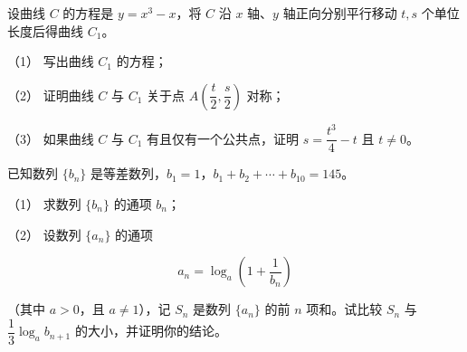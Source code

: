 \begin{question}
设曲线 $C$ 的方程是 $y=x^3-x$，将 $C$ 沿 $x$ 轴、$y$ 轴正向分别平行移动 $t,s$ 个单位长度后得曲线 $C_1$。

（1） 写出曲线 $C_1$ 的方程；

（2） 证明曲线 $C$ 与 $C_1$ 关于点 $A\left(\dfrac t2,\dfrac s2\right)$ 对称；

（3） 如果曲线 $C$ 与 $C_1$ 有且仅有一个公共点，证明 $s=\dfrac{t^3}{4}-t$ 且 $t\neq0$。

\end{question}
\begin{question}
已知数列 $\{b_n\}$ 是等差数列，$b_1=1$，$b_1+b_2+\cdots+b_{10}=145$。

（1） 求数列 $\{b_n\}$ 的通项 $b_n$；

（2） 设数列 $\{a_n\}$ 的通项

\nopagebreak[4]
\[
a_n=\log_a\left(1+\frac1{b_n}\right)
\]

（其中 $a>0$，且 $a\neq1$），记 $S_n$ 是数列 $\{a_n\}$ 的前 $n$ 项和。试比较 $S_n$ 与 $\dfrac13\log_a b_{n+1}$ 的大小，并证明你的结论。

\end{question}